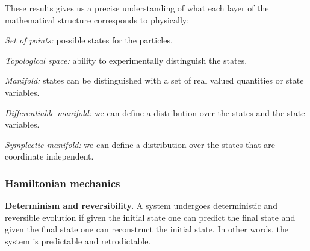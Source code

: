 \documentclass[twocolumn]{article}
\begin{document}
These results gives us a precise understanding of what each layer of the mathematical structure corresponds to physically:
\begin{description}[noitemsep]
	\item \emph{Set of points:} possible states for the particles.
	\item \emph{Topological space:} ability to experimentally distinguish the states.
	\item \emph{Manifold:} states can be distinguished with a set of real valued quantities or state variables.
	\item \emph{Differentiable manifold:} we can define a distribution over the states and the state variables.
	\item \emph{Symplectic manifold:} we can define a distribution over the states that are coordinate independent.
\end{description}

\subsubsection{Hamiltonian mechanics}

\textbf{Determinism and reversibility.} A system undergoes deterministic and reversible evolution if given the initial state one can predict the final state and given the final state one can reconstruct the initial state. In other words, the system is predictable and retrodictable.
\end{document}

